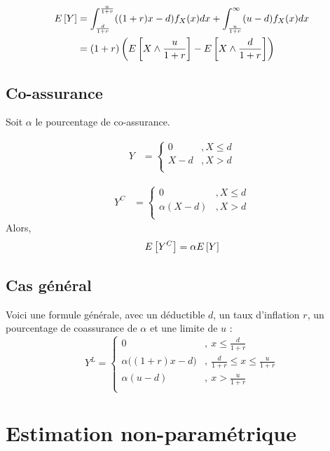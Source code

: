 \documentclass[12pt, french]{report}
\begin{document}
\begin{align*}
E \left[ Y \right]	& = \int_{\frac{d}{1+r}}^{\frac{u}{1+r}} ((1+r) x - d) f_X(x) dx + \int_{\frac{u}{1+r}}^{\infty} (u-d) f_X(x) dx \\
	& = (1+r) \left( E \left[ X \wedge \frac{u}{1+r} \right] - E \left[ X \wedge \frac{d}{1+r} \right]   \right) \\
\end{align*}


\section{Co-assurance}
Soit $\alpha$ le pourcentage de co-assurance.

\begin{align*}
Y	& = 
\begin{cases}
0		& , X \leq d \\
X - d	& , X > d \\
\end{cases}
\end{align*}

\begin{align*}
Y^C	& = 
\begin{cases}
0		& , X  \leq d \\
\alpha(X - d) 	& , X > d \\
\end{cases}
\end{align*}
Alors,
\begin{equation}
E \left[ Y^C \right] = \alpha E \left[ Y \right]
\end{equation}

\section{Cas général}
Voici une formule générale, avec un déductible $d$, un taux d'inflation $r$, un pourcentage de coassurance de $\alpha$ et une limite de $u$ : 
\begin{equation}
Y^L = 
\begin{cases}
0		& ,\ x \leq \frac{d}{1+r} \\
\alpha \Big( (1+r) x - d \Big)	& ,\ \frac{d}{1+r} \leq x \leq \frac{u}{1+r} \\
\alpha (u-d)		& ,\ x > \frac{u}{1+r} \\
\end{cases}
\end{equation}


\chapter{Estimation non-paramétrique}
\end{document}
